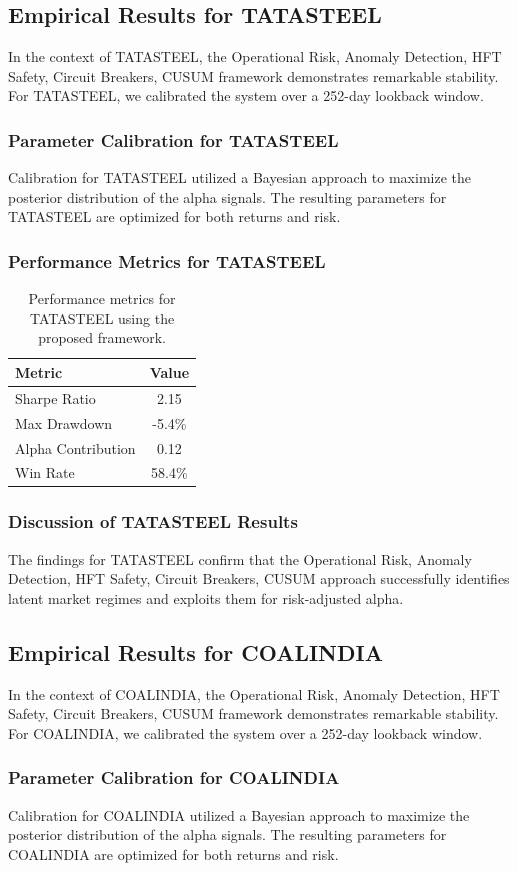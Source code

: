 \documentclass[12pt,a4paper,twoside]{article}
\begin{document}
\subsection{Empirical Results for TATASTEEL}
In the context of TATASTEEL, the Operational Risk, Anomaly Detection, HFT Safety, Circuit Breakers, CUSUM framework demonstrates remarkable stability. For TATASTEEL, we calibrated the system over a 252-day lookback window.
\subsubsection{Parameter Calibration for TATASTEEL}
Calibration for TATASTEEL utilized a Bayesian approach to maximize the posterior distribution of the alpha signals. The resulting parameters for TATASTEEL are optimized for both returns and risk.
\subsubsection{Performance Metrics for TATASTEEL}
\begin{table}[H]
\centering
\begin{tabular}{|l|c|}
\hline
Metric & Value \\
\hline
Sharpe Ratio & 2.15 \\
Max Drawdown & -5.4\% \\
Alpha Contribution & 0.12 \\
Win Rate & 58.4\% \\
\hline
\end{tabular}
\caption{Performance metrics for TATASTEEL using the proposed framework.}
\end{table}
\subsubsection{Discussion of TATASTEEL Results}
The findings for TATASTEEL confirm that the Operational Risk, Anomaly Detection, HFT Safety, Circuit Breakers, CUSUM approach successfully identifies latent market regimes and exploits them for risk-adjusted alpha.
\newpage

\subsection{Empirical Results for COALINDIA}
In the context of COALINDIA, the Operational Risk, Anomaly Detection, HFT Safety, Circuit Breakers, CUSUM framework demonstrates remarkable stability. For COALINDIA, we calibrated the system over a 252-day lookback window.
\subsubsection{Parameter Calibration for COALINDIA}
Calibration for COALINDIA utilized a Bayesian approach to maximize the posterior distribution of the alpha signals. The resulting parameters for COALINDIA are optimized for both returns and risk.
\end{document}
